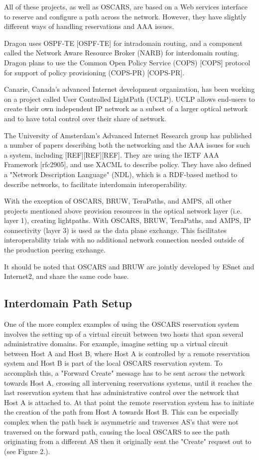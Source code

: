 \documentclass[conference]{IEEEtran}
\begin{document}
All of these projects, as well as OSCARS, are based on a Web services 
interface to reserve and configure a path across the network. However, they 
have slightly different ways of handling reservations and AAA issues.

Dragon uses OSPF-TE [OSPF-TE] for intradomain routing, and a component called
the Network Aware Resource Broker (NARB) for interdomain routing.
Dragon plans to use the Common Open Policy Service (COPS) [COPS]
protocol for support of policy provisioning (COPS-PR) [COPS-PR].

Canarie, Canada's advanced Internet development organization, has been
working on a project called User Controlled LightPath (UCLP).  UCLP
allows end-users to create their own independent IP network as a subset
of a larger optical network and to have total control over their share
of network.

The University of Amsterdam's Advanced Internet Research group has
published a number of papers
describing both the networking and the AAA issues for such a system,
including [REF][REF][REF]. They are using the IETF AAA Framework
[rfc2905], and use XACML to describe policy. They have also defined a
"Network Description Language" (NDL), which is a RDF-based method to
describe networks, to facilitate interdomain interoperability.

With the exception of OSCARS, BRUW,
TeraPaths, and AMPS, all other projects mentioned above provision resources
in the optical network layer (i.e. layer 1), creating lightpaths.
With OSCARS, BRUW, TeraPaths, and AMPS, IP connectivity (layer
3) is used as the data plane exchange.  This facilitates interoperability
trials with no additional network connection needed outside of the production
peering exchange.

It should be noted that OSCARS and BRUW are jointly developed by ESnet and 
Internet2, and share the same code base.

\subsection{Interdomain Path Setup }
One of the more complex examples of using the OSCARS reservation system 
involves
the setting up of a virtual circuit between two hosts that span several 
administrative domains.  For example, imagine setting up a
virtual circuit between Host A and Host B, where Host A is controlled by a
remote reservation
system and Host B is part of the local OSCARS reservation system.  To 
accomplish
this, a "Forward Create" message has to be sent across the network towards Host
A, crossing all intervening reservations systems, until it reaches the last
reservation system that has administrative control over the network that Host A is attached to.
At that point the remote reservation system has to initiate the creation of the
path from Host A towards Host B.  This can be especially complex when the path
back is asymmetric and traverses AS's that were not traversed on the forward
path, causing the local OSCARS to see the path originating from a different 
AS then it originally sent the "Create" request out to (see Figure 2.).
\end{document}

